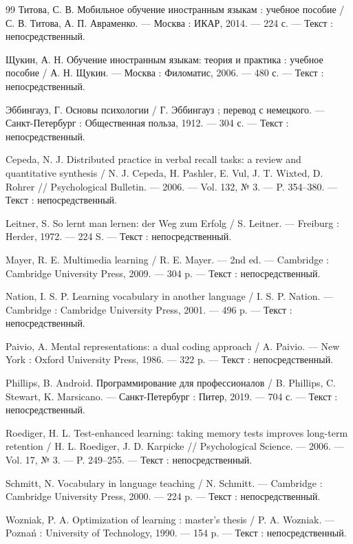 \documentclass[11pt,a4paper,openany]{report}
\begin{document}
\begin{thebibliography}{99}
\bibitem{} Титова, С. В. Мобильное обучение иностранным языкам : учебное пособие / С. В. Титова, А. П. Авраменко. — Москва : ИКАР, 2014. — 224 с. — Текст : непосредственный.

\bibitem{} Щукин, А. Н. Обучение иностранным языкам: теория и практика : учебное пособие / А. Н. Щукин. — Москва : Филоматис, 2006. — 480 с. — Текст : непосредственный.

\bibitem{} Эббингауз, Г. Основы психологии / Г. Эббингауз ; перевод с немецкого. — Санкт-Петербург : Общественная польза, 1912. — 304 с. — Текст : непосредственный.

\bibitem{} Cepeda, N. J. Distributed practice in verbal recall tasks: a review and quantitative synthesis / N. J. Cepeda, H. Pashler, E. Vul, J. T. Wixted, D. Rohrer // Psychological Bulletin. — 2006. — Vol. 132, № 3. — P. 354–380. — Текст : непосредственный.

\bibitem{} Leitner, S. So lernt man lernen: der Weg zum Erfolg / S. Leitner. — Freiburg : Herder, 1972. — 224 S. — Текст : непосредственный.

\bibitem{} Mayer, R. E. Multimedia learning / R. E. Mayer. — 2nd ed. — Cambridge : Cambridge University Press, 2009. — 304 p. — Текст : непосредственный.

\bibitem{} Nation, I. S. P. Learning vocabulary in another language / I. S. P. Nation. — Cambridge : Cambridge University Press, 2001. — 496 p. — Текст : непосредственный.

\bibitem{} Paivio, A. Mental representations: a dual coding approach / A. Paivio. — New York : Oxford University Press, 1986. — 322 p. — Текст : непосредственный.

\bibitem{} Phillips, B. Android. Программирование для профессионалов / B. Phillips, C. Stewart, K. Marsicano. — Санкт-Петербург : Питер, 2019. — 704 с. — Текст : непосредственный.

\bibitem{} Roediger, H. L. Test-enhanced learning: taking memory tests improves long-term retention / H. L. Roediger, J. D. Karpicke // Psychological Science. — 2006. — Vol. 17, № 3. — P. 249–255. — Текст : непосредственный.

\bibitem{} Schmitt, N. Vocabulary in language teaching / N. Schmitt. — Cambridge : Cambridge University Press, 2000. — 224 p. — Текст : непосредственный.

\bibitem{} Wozniak, P. A. Optimization of learning : master's thesis / P. A. Wozniak. — Poznań : University of Technology, 1990. — 154 p. — Текст : непосредственный.


\end{thebibliography}
\end{document}
